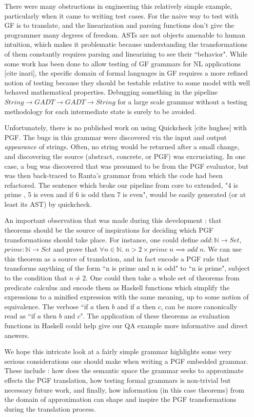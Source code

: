 There were many obstructions in engineering this relatively simple
example, particularly when it came to writing test cases. For the naive
way to test with GF is to translate, and the linearization and parsing functions
don't give the programmer many degrees of freedom. ASTs are not objects amenable
to human intuition, which makes it problematic because understanding the
transformations of them constantly requires parsing and linearizing to see their
``behavior". While some work has been done to allow testing
of GF grammars for NL applications [cite inari], the specific domain of formal languages in
GF requires a more refined notion of testing because they should be testable
relative to some model with well behaved mathematical properties. Debugging
something in the pipeline $String \rightarrow GADT \rightarrow GADT \rightarrow
String$ for a large scale grammar without a testing methodology for each
intermediate state is surely to be avoided.

Unfortunately, there is no published work on using Quickcheck [cite hughes] with
PGF. The bugs in this grammar were discovered via the input and output
\emph{appearance} of strings. Often, no string would be returned after a small
change, and discovering the source (abstract, concrete, or PGF) was
excruciating. In one case, a bug was discovered that was presumed to be from the
PGF evaluator, but was then back-traced to Ranta's grammar from which the code
had been refactored. The sentence which broke our pipeline from core to
extended, "4 is prime , 5 is even and if 6 is odd then 7 is even", would be
easily generated (or at least its AST) by quickcheck.

An important observation that was made during this development : that theorems
should be the source of inspirations for deciding which PGF transformations
should take place. For instance, one could define $odd : \mathds{N}
\rightarrow Set$, $prime : \mathds{N} \rightarrow Set$ and prove that $\forall n
\in \mathds{N}.\; n > 2 \times prime\; n \implies odd\; n$. We can use this
theorem as a source of translation, and in fact encode a PGF rule that
transforms anything of the form ``n is prime and n is odd" to ``n is prime",
subject to the condition that $n \neq 2$. One could then take a whole set of
theorems from predicate calculus and encode them as Haskell functions which
simplify the expressions to a minified expression with the
same meaning, up to some notion of equivalence. The verbose ``if $a$ then $b$
and if $a$ then $c$, can be more canonically read as ``if $a$ then $b$ and $c$".
The application of these theorems as evaluation functions in Haskell could
help give our QA example more informative and direct answers.

We hope this intricate look at a fairly simple grammar highlights some very
serious considerations one should make when writing a PGF embedded grammar.
These include : how does the semantic space the grammar seeks to approximate
effects the PGF translation, how testing formal grammars is non-trivial but
necessary future work, and finally, how information (in this case theorems) from
the domain of approximation can shape and inspire the PGF transformations 
during the translation process.
